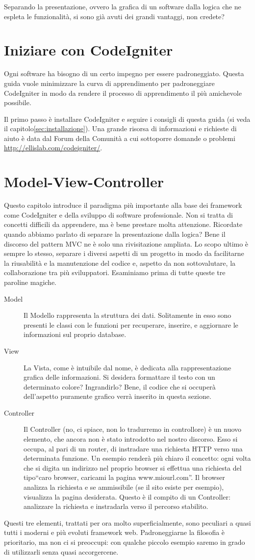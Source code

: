 Separando la presentazione, ovvero la grafica di un software dalla logica che ne espleta le funzionalità, si sono già avuti dei grandi vantaggi, non credete?


\label{sec:config}
\section{Iniziare con CodeIgniter}
Ogni software ha bisogno di un certo impegno per essere padroneggiato. Questa guida vuole minimizzare la curva di apprendimento per padroneggiare CodeIgniter in modo da rendere il processo di apprendimento il più amichevole possibile.

Il primo passo è installare CodeIgniter e seguire i consigli di questa guida (si veda il capitolo\vref{sec:installazione}). Una grande risorsa di informazioni e richieste di aiuto è data dal Forum della Comunità a cui sottoporre domande o problemi \url{http://ellislab.com/codeigniter/}.

\section{Model-View-Controller}
Questo capitolo introduce il paradigma più importante alla base dei framework come CodeIgniter e della sviluppo di software professionale. Non si tratta di concetti difficili da apprendere, ma è bene prestare molta attenzione. Ricordate quando abbiamo parlato di separare la presentazione dalla logica? Bene il discorso del pattern \ac{MVC} ne è solo una rivisitazione ampliata. Lo scopo ultimo è sempre lo stesso, separare i diversi aspetti di un progetto in modo da facilitarne la riusabilità e la manutenzione del codice e, aspetto da non sottovalutare, la collaborazione tra più sviluppatori. Esaminiamo prima di tutte queste tre paroline magiche.

\begin{description}
\item [Model] Il Modello rappresenta la struttura dei dati. Solitamente in esso sono presenti le classi con le funzioni per recuperare, inserire, e aggiornare le informazioni sul proprio database.
\item [View] La Vista, come è intuibile dal nome, è dedicata alla rappresentazione grafica delle informazioni. Si desidera formattare il testo con un determinato colore? Ingrandirlo? Bene, il codice che si occuperà dell'aspetto puramente grafico verrà inserito in questa sezione.
\item [Controller] Il Controller (no, ci spiace, non lo tradurremo in controllore) è un nuovo elemento, che ancora non è stato introdotto nel nostro discorso. Esso si occupa, al pari di un router, di instradare una richiesta \ac{HTTP} verso una determinata funzione. Un esempio renderà più chiaro il concetto: ogni volta che si digita un indirizzo nel proprio browser si effettua una richiesta del tipo``caro browser, caricami la pagina www.miourl.com''. Il browser analizza la richiesta e se ammissibile (se il sito esiste per esempio), visualizza la pagina desiderata. Questo è il compito di un Controller: analizzare la richiesta e instradarla verso il percorso stabilito. 
\end{description}

Questi tre elementi, trattati per ora molto superficialmente, sono peculiari a quasi tutti i moderni e più evoluti framework web. Padroneggiarne la filosofia è prioritario, ma non ci si preoccupi: con qualche piccolo esempio saremo in grado di utilizzarli senza quasi accorgercene.